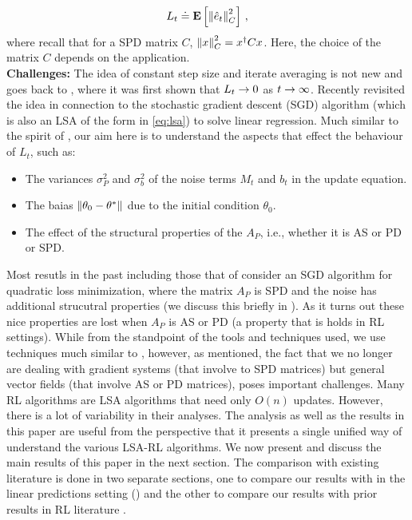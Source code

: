 \begin{align}\label{eq:exploss}
L_t \doteq \mathbf{E}\left[ \left\| \hat{e}_t\right\|_{C}^2 \right]\,,
\end{align}
where recall that for a SPD matrix $C$, $\left\| x\right\|_C^2 = x^\dag C x$. Here, the choice of the matrix $C$ depends on the application.\\
\textbf{Challenges:}
The idea of constant step size and iterate averaging is not new and goes back to \cite{}, where it was first shown that $L_t\rightarrow 0$ as $t\rightarrow\infty$. Recently \cite{bach} revisited the idea in connection to the stochastic gradient descent (SGD) algorithm (which is also an LSA of the form in \eqref{eq:lsa}) to solve linear regression. Much similar to the spirit of \cite{bach}, our aim here is to understand the aspects that effect the behaviour of $L_t$, such as:
\begin{itemize}
\item The variances $\sigma_P^2$ and $\sigma_b^2$ of the noise terms $M_t$ and $b_t$ in the update equation.
\item The baias $\left\| \theta_0-\theta^*\right\|$ due to the initial condition $\theta_0$.
\item The effect of the structural properties of the $A_P$, i.e., whether it is AS or PD or SPD.
\end{itemize}
Most resutls in the past including those that of \cite{bach} consider an SGD algorithm for quadratic loss minimization, where the matrix $A_P$ is SPD and the noise has additional strucutral properties (we discuss this briefly in ). As it turns out these nice properties are lost when $A_P$ is AS or PD (a property that is holds in RL settings). While from the standpoint of the tools and techniques used, we use techniques much similar to \cite{bach}, however, as mentioned, the fact that we no longer are dealing with gradient systems (that involve to SPD matrices) but general vector fields (that involve AS or PD matrices), poses important challenges.
Many RL algorithms \cite{} are LSA algorithms that need only $O(n)$ updates. However, there is a lot of variability in their analyses. The analysis as well as the results in this paper are useful from the perspective that it presents a single unified way of understand the various LSA-RL algorithms. We now present and discuss the main results of this paper in the next section. The comparison with existing literature is done in two separate sections, one to compare our results with \cite{bach} in the linear predictions setting () and the other to compare our results with prior results in RL literature \cite{}.
